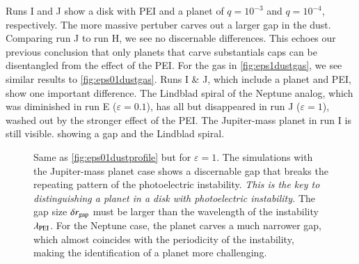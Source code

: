 \documentclass[onecolumn]{report}
\newcommand{\epsi}{\varepsilon}
\begin{document}
Runs I and J show a disk with PEI and a planet of $q=10^{-3}$ and $q=10^{-4}$, respectively. The more massive pertuber carves out a larger gap in the dust. Comparing run J to run H, we see no discernable differences. This echoes our previous conclusion that only planets that carve substantials caps can be disentangled from the effect of the PEI. For the gas in \ref{fig:eps1dustgas}, we see similar results to \ref{fig:eps01dustgas}. Runs I \& J, which include a planet and PEI, show one important difference. The Lindblad spiral of the Neptune analog, which was diminished in run E ($\epsi=0.1$), has all but disappeared in run J ($\epsi=1$), washed out by the stronger effect of the PEI. The Jupiter-mass planet in run I is still visible. showing a gap and the Lindblad spiral.

\begin{figure}
  \begin{center}
  \end{center}
  \caption{Same as \ref{fig:eps01dustprofile} but for $\varepsilon=1$. The
    simulations with the Jupiter-mass planet case shows a
    discernable gap that breaks the repeating pattern of the
    photoelectric instability. {\it This is the key to distinguishing
      a planet in a disk with photoelectric instability.} The gap size
    $\delta r_{\rm gap}$ must be larger than the wavelength of the
    instability $\lambda_{\rm PEI}$. For the Neptune case, the planet
    carves a much narrower gap, which almost coincides with the
    periodicity of the instability, making the identification of a
    planet more challenging.}
  \label{fig:eps1dustprofile}
\end{figure}
\end{document}
